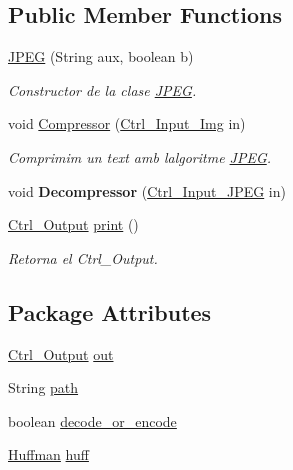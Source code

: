 \subsection*{Public Member Functions}
\begin{DoxyCompactItemize}
\item 
\hyperlink{classdomini_1_1algorithm_1_1JPEG_a9dce5a80ccc8b626758cb4ae0b93e056}{J\+P\+EG} (String aux, boolean b)
\begin{DoxyCompactList}\small\item\em Constructor de la clase \hyperlink{classdomini_1_1algorithm_1_1JPEG}{J\+P\+EG}. \end{DoxyCompactList}\item 
void \hyperlink{classdomini_1_1algorithm_1_1JPEG_a457ac869c214dffce8a78c0c14c4bf8b}{Compressor} (\hyperlink{classpersistencia_1_1input_1_1Ctrl__Input__Img}{Ctrl\+\_\+\+Input\+\_\+\+Img} in)
\begin{DoxyCompactList}\small\item\em Comprimim un text amb l\textquotesingle{}algoritme \hyperlink{classdomini_1_1algorithm_1_1JPEG}{J\+P\+EG}. \end{DoxyCompactList}\item 
\mbox{\label{classdomini_1_1algorithm_1_1JPEG_af78f9030854c1823d28f34f2205d6740}} 
void {\bfseries Decompressor} (\hyperlink{classpersistencia_1_1input_1_1Ctrl__Input__JPEG}{Ctrl\+\_\+\+Input\+\_\+\+J\+P\+EG} in)
\item 
\hyperlink{classpersistencia_1_1output_1_1Ctrl__Output}{Ctrl\+\_\+\+Output} \hyperlink{classdomini_1_1algorithm_1_1JPEG_a02fa1a8d05204b71cf6d5e8d6bbd3d2b}{print} ()
\begin{DoxyCompactList}\small\item\em Retorna el Ctrl\+\_\+\+Output. \end{DoxyCompactList}\end{DoxyCompactItemize}
\subsection*{Package Attributes}
\begin{DoxyCompactItemize}
\item 
\hyperlink{classpersistencia_1_1output_1_1Ctrl__Output}{Ctrl\+\_\+\+Output} \hyperlink{classdomini_1_1algorithm_1_1JPEG_a2512a38136dac55fa5dbbfc8f0ae822d}{out}
\item 
String \hyperlink{classdomini_1_1algorithm_1_1JPEG_a68d523efc6a9dfb3dd2edec0bbb79b48}{path}
\item 
boolean \hyperlink{classdomini_1_1algorithm_1_1JPEG_a3ff24cf46363c31ffa24e3604bf3ced8}{decode\+\_\+or\+\_\+encode}
\item 
\hyperlink{classdomini_1_1algorithm_1_1Huffman}{Huffman} \hyperlink{classdomini_1_1algorithm_1_1JPEG_aacc6445baa7819e3f9139ffb78e0b8f4}{huff}
\end{DoxyCompactItemize}
